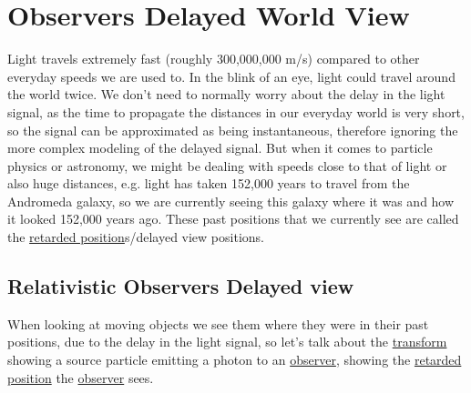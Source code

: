 \chapter{Observers Delayed World View}

Light travels extremely fast (roughly 300,000,000 m/s) compared to other everyday speeds we are used to. In the blink of an eye, light could travel around the world twice. We don't need to normally worry about the delay in the light signal, as the time to propagate the distances in our everyday world is very short, so the signal can be approximated as being instantaneous, therefore ignoring the more complex modeling of the delayed signal. But when it comes to particle physics or astronomy, we might be dealing with speeds close to that of light or also huge distances, e.g. light has taken 152,000 years to travel from the Andromeda galaxy, so we are currently seeing this galaxy where it was and how it looked 152,000 years ago. These past positions that we currently see are called the \hyperlink{def-retarded-position}{retarded position}s/delayed view positions.

\section{Relativistic Observers Delayed view}

When looking at moving objects we see them where they were in their past positions, due to the delay in the light signal, so let's talk about the \hyperlink{def-transform}{transform} showing a source particle emitting a photon to an \hyperlink{def-observer}{observer}, showing the \hyperlink{def-retarded-position}{retarded position} the \hyperlink{def-observer}{observer} sees.

